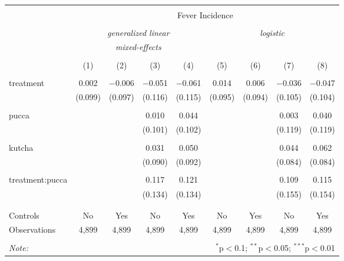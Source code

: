 
\begin{table}[!htbp] \centering 
  \caption{} 
  \label{} 
\begin{tabular}{@{\extracolsep{5pt}}lcccccccc} 
\\[-1.8ex]\hline 
\hline \\[-1.8ex] 
 & \multicolumn{8}{c}{Fever Incidence} \\ 
\cline{2-9} 
\\[-1.8ex] & \multicolumn{4}{c}{\textit{generalized linear}} & \multicolumn{4}{c}{\textit{logistic}} \\ 
 & \multicolumn{4}{c}{\textit{mixed-effects}} & \multicolumn{4}{c}{\textit{}} \\ 
\\[-1.8ex] & (1) & (2) & (3) & (4) & (5) & (6) & (7) & (8)\\ 
\hline \\[-1.8ex] 
 treatment & 0.002 & $-$0.006 & $-$0.051 & $-$0.061 & 0.014 & 0.006 & $-$0.036 & $-$0.047 \\ 
  & (0.099) & (0.097) & (0.116) & (0.115) & (0.095) & (0.094) & (0.105) & (0.104) \\ 
  & & & & & & & & \\ 
 pucca &  &  & 0.010 & 0.044 &  &  & 0.003 & 0.040 \\ 
  &  &  & (0.101) & (0.102) &  &  & (0.119) & (0.119) \\ 
  & & & & & & & & \\ 
 kutcha &  &  & 0.031 & 0.050 &  &  & 0.044 & 0.062 \\ 
  &  &  & (0.090) & (0.092) &  &  & (0.084) & (0.084) \\ 
  & & & & & & & & \\ 
 treatment:pucca &  &  & 0.117 & 0.121 &  &  & 0.109 & 0.115 \\ 
  &  &  & (0.134) & (0.134) &  &  & (0.155) & (0.154) \\ 
  & & & & & & & & \\ 
\hline \\[-1.8ex] 
Controls & No & Yes & No & Yes & No & Yes & No & Yes \\ 
Observations & 4,899 & 4,899 & 4,899 & 4,899 & 4,899 & 4,899 & 4,899 & 4,899 \\ 
\hline 
\hline \\[-1.8ex] 
\textit{Note:}  & \multicolumn{8}{r}{$^{*}$p$<$0.1; $^{**}$p$<$0.05; $^{***}$p$<$0.01} \\ 
\end{tabular} 
\end{table} 
